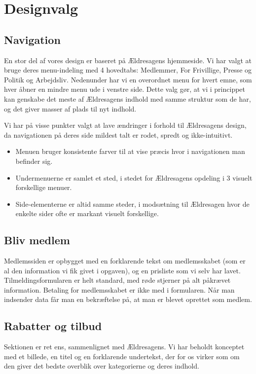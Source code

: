 \section{Designvalg}
\subsection{Navigation}
En stor del af vores design er baseret på Ældresagens hjemmeside. Vi har
valgt at bruge deres menu-indeling med 4 hovedtabs: Medlemmer, For Frivillige,
Presse og Politik og Arbejdsliv. Nedenunder har vi en overordnet menu for hvert
emne, som hver åbner en mindre menu ude i venstre side. Dette valg gør, at vi i
princippet kan genskabe det meste af Ældresagens indhold med samme struktur som de
har, og det giver masser af plads til nyt indhold. 

Vi har på visse punkter valgt at lave ændringer i forhold til Ældresagens design, da
navigationen på deres side mildest talt er rodet, spredt og ikke-intuitivt. 

\begin{itemize}
\item Menuen bruger konsistente farver til at vise præcis hvor i navigationen man befinder sig.
\item Undermenuerne er samlet et sted, i stedet for Ældresagens opdeling i 3 visuelt forskellige menuer.
\item Side-elementerne er altid samme steder, i modsætning til Ældresagen hvor de enkelte sider
      ofte er markant visuelt forskellige.
\end{itemize}

\subsection{Bliv medlem}
Medlemssiden er opbygget med en forklarende tekst om medlemsskabet (som er al den information vi fik givet i opgaven),
og en prisliste som vi selv har lavet. Tilmeldingsformularen er helt standard, med røde stjerner på alt påkrævet information.
Betaling for medlemsskabet er ikke med i formularen. Når man indsender data får man en bekræftelse på, at man er blevet oprettet
som medlem.

\subsection{Rabatter og tilbud}
Sektionen er ret ens, sammenlignet med Ældresagens. Vi har beholdt konceptet med et billede, en titel og en forklarende undertekst, der for os virker som om den giver det bedste overblik over kategorierne og deres indhold.

